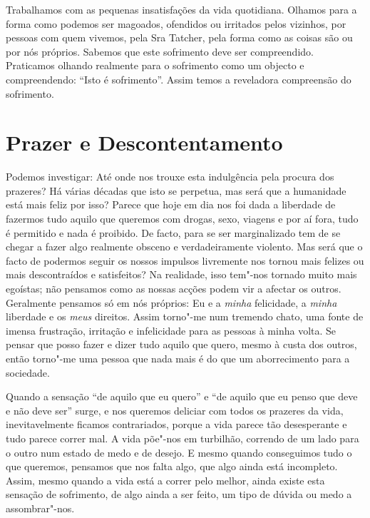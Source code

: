 Trabalhamos com as pequenas insatisfações da vida quotidiana. Olhamos para a
forma como podemos ser magoados, ofendidos ou irritados pelos vizinhos, por
pessoas com quem vivemos, pela Sra Tatcher, pela forma como as coisas são ou por
nós próprios. Sabemos que este sofrimento deve ser compreendido. Praticamos
olhando realmente para o sofrimento como um objecto e compreendendo: “Isto é
sofrimento”. Assim temos a reveladora compreensão do sofrimento.

\section{Prazer e Descontentamento}

\enlargethispage{\baselineskip}

Podemos investigar: Até onde nos trouxe esta indulgência pela procura dos
prazeres? Há várias décadas que isto se perpetua, mas será que a humanidade está
mais feliz por isso? Parece que hoje em dia nos foi dada a liberdade de fazermos
tudo aquilo que queremos com drogas, sexo, viagens e por aí fora, tudo é
permitido e nada é proibido. De facto, para se ser marginalizado tem de se
chegar a fazer algo realmente obsceno e verdadeiramente violento. Mas será que o
facto de podermos seguir os nossos impulsos livremente nos tornou mais felizes
ou mais descontraídos e satisfeitos? Na realidade, isso tem"-nos tornado muito
mais egoístas; não pensamos como as nossas acções podem vir a afectar os outros.
Geralmente pensamos só em nós próprios: Eu e a \emph{minha} felicidade, a
\emph{minha} liberdade e os \emph{meus} direitos. Assim torno"-me num tremendo
chato, uma fonte de imensa frustração, irritação e infelicidade para as pessoas
à minha volta. Se pensar que posso fazer e dizer tudo aquilo que quero, mesmo à
custa dos outros, então torno"-me uma pessoa que nada mais é do que um
aborrecimento para a sociedade.

Quando a sensação “de aquilo que eu quero” e “de aquilo que eu penso que deve e
não deve ser” surge, e nos queremos deliciar com todos os prazeres da vida,
inevitavelmente ficamos contrariados, porque a vida parece tão desesperante e
tudo parece correr mal. A vida põe"-nos em turbilhão, correndo de um lado para o
outro num estado de medo e de desejo. E mesmo quando conseguimos tudo o que
queremos, pensamos que nos falta algo, que algo ainda está incompleto. Assim,
mesmo quando a vida está a correr pelo melhor, ainda existe esta sensação de
sofrimento, de algo ainda a ser feito, um tipo de dúvida ou medo a
assombrar"-nos.

